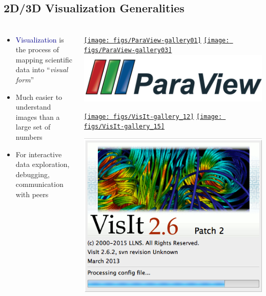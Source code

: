 \subsection{2D/3D Visualization Generalities}
\begin{frame}
    \frametitle{}
    \framesubtitle{}

    \begin{columns} %
    \begin{column}{5.25cm}
        \begin{itemize}
                \item \textcolor{DarkBlue}{Visualization} is the process of mapping scientific data into ``{\it visual form}''
                \item Much easier to understand images than a large set of numbers
                \item For interactive data exploration, debugging, communication with peers
        \end{itemize}
    \end{column}
    \begin{column}{7cm}
        \href{http://www.paraview.org/gallery/}{\texttt{[image: figs/ParaView-gallery01]}}
        \href{http://www.paraview.org/gallery/}{\texttt{[image: figs/ParaView-gallery03]}}
        \centering
        \href{http://www.paraview.org}{\includegraphics[width=.45\columnwidth]{./figs/visit-logos//ParaViewLogo}}


        \href{https://wci.llnl.gov/simulation/computer-codes/visit/gallery}{\texttt{[image: figs/VisIt-gallery\_12]}}
        \href{https://wci.llnl.gov/simulation/computer-codes/visit/gallery}{\texttt{[image: figs/VisIt-gallery\_15]}}

        \centering
        \href{https://wci.llnl.gov/simulation/computer-codes/visit/}{\includegraphics[width=.45\columnwidth, clip=true,trim=0 2cm 0 0]{./figs/visit-logos//VisIt26}}
    \end{column}
    \end{columns}



\end{frame}

